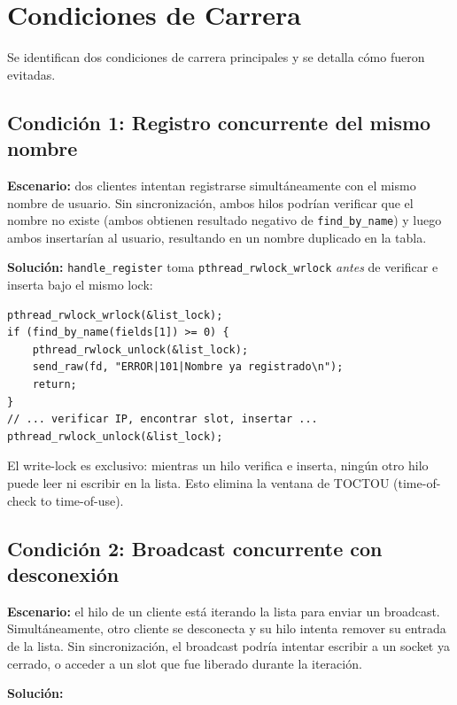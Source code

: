 \documentclass[12pt,a4paper]{article}
\begin{document}
\section{Condiciones de Carrera}
\label{sec:races}

Se identifican dos condiciones de carrera principales y se detalla cómo fueron
evitadas.

\subsection{Condición 1: Registro concurrente del mismo nombre}

\textbf{Escenario:} dos clientes intentan registrarse simultáneamente con el mismo
nombre de usuario.  Sin sincronización, ambos hilos podrían verificar que el nombre
no existe (ambos obtienen resultado negativo de \texttt{find\_by\_name}) y luego
ambos insertarían al usuario, resultando en un nombre duplicado en la tabla.

\textbf{Solución:} \texttt{handle\_register} toma \texttt{pthread\_rwlock\_wrlock}
\textit{antes} de verificar e inserta bajo el mismo lock:

\begin{lstlisting}[caption={Atomicidad de verificación e inserción en registro}]
pthread_rwlock_wrlock(&list_lock);
if (find_by_name(fields[1]) >= 0) {
    pthread_rwlock_unlock(&list_lock);
    send_raw(fd, "ERROR|101|Nombre ya registrado\n");
    return;
}
// ... verificar IP, encontrar slot, insertar ...
pthread_rwlock_unlock(&list_lock);
\end{lstlisting}

El write-lock es exclusivo: mientras un hilo verifica e inserta, ningún otro hilo
puede leer ni escribir en la lista.  Esto elimina la ventana de TOCTOU
(time-of-check to time-of-use).

\subsection{Condición 2: Broadcast concurrente con desconexión}

\textbf{Escenario:} el hilo de un cliente está iterando la lista para enviar un
broadcast.  Simultáneamente, otro cliente se desconecta y su hilo intenta remover
su entrada de la lista.  Sin sincronización, el broadcast podría intentar escribir a
un socket ya cerrado, o acceder a un slot que fue liberado durante la iteración.

\textbf{Solución:}
\end{document}
